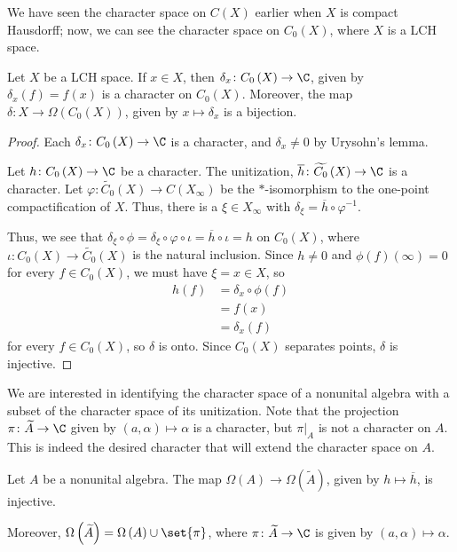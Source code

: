 \documentclass[10pt]{mypackage}
\begin{document}
We have seen the character space on $C(X)$ earlier when $X$ is compact Hausdorff; now, we can see the character space on $C_0\left(X\right)$, where $X$ is a LCH space.
\begin{corollary}
  Let $X$ be a LCH space. If $x\in X$, then $\delta_x\colon C_0\left(X\right)\rightarrow \C$, given by $\delta_x(f) = f(x)$ is a character on $C_0\left(X\right)$. Moreover, the map $\delta\colon X\rightarrow \Omega\left(C_0\left(X\right)\right)$, given by $x\mapsto \delta_x$ is a bijection.
\end{corollary}
\begin{proof}
  Each $\delta_x\colon C_0\left(X\right)\rightarrow \C$ is a character, and $\delta_x\neq 0$ by Urysohn's lemma.\newline

  Let $h\colon C_0\left(X\right)\rightarrow \C$ be a character. The unitization, $\overline{h}\colon \widetilde{C_0}\left(X\right)\rightarrow \C$ is a character. Let $\varphi\colon \widetilde{C_0}\left(X\right)\rightarrow C\left(X_{\infty}\right)$ be the $\ast$-isomorphism to the one-point compactification of $X$. Thus, there is a $\xi\in X_{\infty}$ with $\delta_{\xi} = \overline{h}\circ \varphi^{-1}$.\newline

  Thus, we see that $\delta_{\xi} \circ \phi = \delta_{\xi}\circ \varphi \circ \iota = \overline{h}\circ \iota = h$ on $C_0\left(X\right)$, where $\iota\colon C_0\left(X\right)\rightarrow \widetilde{C_0}\left(X\right)$ is the natural inclusion. Since $h\neq 0$ and $\phi(f)(\infty) = 0$ for every $f\in C_0\left(X\right)$, we must have $\xi = x\in X$, so
  \begin{align*}
    h(f) &= \delta_x\circ \phi(f)\\
         &= f(x)\\
         &= \delta_x(f)
  \end{align*}
  for every $f\in C_0\left(X\right)$, so $\delta$ is onto. Since $C_0\left(X\right)$ separates points, $\delta$ is injective.
\end{proof}
We are interested in identifying the character space of a nonunital algebra with a subset of the character space of its unitization. Note that the projection $\pi\colon \widetilde{A}\rightarrow \C$ given by $\left(a,\alpha\right)\mapsto \alpha$ is a character, but $\pi\vert_{A}$ is not a character on $A$. This is indeed the desired character that will extend the character space on $A$.
\begin{proposition}
  Let $A$ be a nonunital algebra. The map $\Omega\left(A\right)\rightarrow \Omega\left(\widetilde{A}\right)$, given by $h\mapsto \overline{h}$, is injective. \newline

  Moreover, $\Omega\left(\widetilde{A}\right) = \Omega\left(A\right)\cup \set{\pi}$, where $\pi\colon \widetilde{A}\rightarrow \C$ is given by $\left(a,\alpha\right)\mapsto \alpha$.
\end{proposition}
\end{document}

